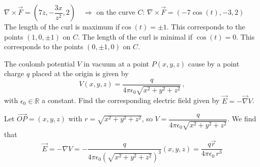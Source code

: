 \begin{Answer}
    $\nabla \times \vec F = \left(7z, -\dfrac{3x}{z^2}, 2 \right) \quad \Rightarrow$ on the curve $C$: $\nabla \times \vec F=\left( -7 \cos(t), -3, 2 \right) $ \\[0.2cm]
    The length of the curl is maximum if$\cos(t) = \pm 1$. This corresponds to the points $(1,0, \pm 1)$ on $C$. The length of the curl is minimal if $\cos(t) = 0$. This corresponds to the points $(0, \pm 1, 0) $ on $C$.
\end{Answer}

\begin{Exercise}[difficulty = 2] The coulomb potential $V$ in vacuum at a point $P(x,y,z)$ cause by a point charge $q$ placed at the origin is given  by
\[ V(x,y,z) = \dfrac{q}{4\pi\epsilon_0 \sqrt{x^2+y^2+z^2}}\,, \]
with $\epsilon_0\in\mathbb{R}$ a constant. Find the corresponding electric field given by $\vec E = -\vec{\nabla} V$.
\end{Exercise}

\begin{Answer}
    Let $\overrightarrow{OP} = (x,y,z)$ with $r=\sqrt{x^2+y^2+z^2}$, so $V = \dfrac{q}{4\pi\epsilon_0 \sqrt{x^2+y^2+z^2}}$. We find that
    \[ \vec E = -\nabla V = -\dfrac{q}{4\pi\epsilon_0 \left(\sqrt{x^2+y^2+z^2}\right)^3}(x,y,z) = \dfrac{q \vec r}{4\pi\epsilon_0\, r^3} \]
\end{Answer}

